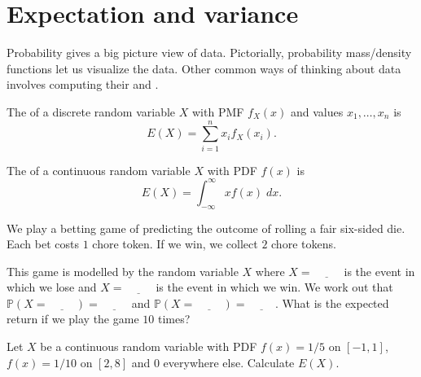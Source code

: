 \documentclass[../main.tex]{subfiles}
\begin{document}
 \section{Expectation and variance}

Probability gives a big picture view of data. Pictorially, probability mass/density functions let us visualize the data. Other common ways of thinking about data involves computing their  and . 

\begin{definition}[expectation]
  The  of a discrete random variable \(X\) with PMF \(f_{X}(x)\) and values \(x_{1}, \ldots, x_{n}\) is
  \begin{equation} \label{eq:expectation-discrete}
    E(X) = \sum_{i = 1}^{n} x_{i} f_{X}(x_{i}).
  \end{equation}

  The  of a continuous random variable \(X\) with PDF \(f(x)\) is
  \begin{equation} \label{eq:expectation-continuous}
    E(X) = \int_{-\infty}^{\infty} x f(x) \;dx.
  \end{equation}
\end{definition}

\begin{example} \label{ex:variance-discrete-betting}
  We play a betting game of predicting the outcome of rolling a fair six-sided die.  Each bet costs \(1\) chore token. If we win, we collect \(2\) chore tokens.

  This game is modelled by the random variable \(X\) where \(X = \underline{\hspace{1cm}}\) is the event in which we lose and \(X = \underline{\hspace{1cm}}\) is the event in which we win.  We work out that \(\mathbb{P}(X = \underline{\hspace{1cm}}) = \underline{\hspace{1cm}}\) and \(\mathbb{P}(X = \underline{\hspace{1cm}}) = \underline{\hspace{1cm}}\).  What is the expected return if we play the game \(10\) times?

\end{example}

\begin{example} \label{ex:variance-continuous-uniform}
  Let \(X\) be a continuous random variable with PDF \(f(x) = 1/5\) on \([-1, 1]\), \(f(x) = 1/10\) on \([2,8]\) and \(0\) everywhere else.  Calculate \(E(X)\).

\end{example}
\clearpage
\end{document}

